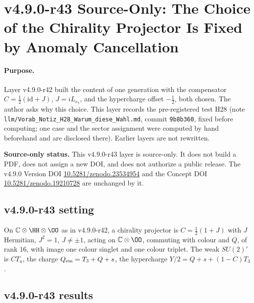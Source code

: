 \clearpage
\section*{v4.9.0-r43 Source-Only: The Choice of the Chirality Projector Is Fixed by Anomaly Cancellation}
\label{sec:v490-r43-choice-anomalies}

\paragraph{Purpose.}
Layer v4.9.0-r42 built the content of one generation with the compensator \(C=\tfrac12(\mathrm{id}+J)\), \(J=iL_{e_7}\), and the hypercharge
offset \(-\tfrac12\), both chosen.  The author asks why this choice.  This layer records the pre-registered test H28 (note
\texttt{llm/Vorab\_Notiz\_H28\_Warum\_diese\_Wahl.md}, commit \texttt{9b8b360}, fixed before computing; one case and the sector
assignment were computed by hand beforehand and are disclosed there).  Earlier layers are not rewritten.

\noindent\textbf{Source-only status.}
This v4.9.0-r43 layer is source-only.  It does not build a PDF, does not assign a new DOI,
and does not authorize a public release.  The v4.9.0 Version DOI
\href{https://doi.org/10.5281/zenodo.23534954}{10.5281/zenodo.23534954} and the Concept DOI
\href{https://doi.org/10.5281/zenodo.19210728}{10.5281/zenodo.19210728} are unchanged by it.

\subsection*{v4.9.0-r43 setting}
\label{subsec:v490-r43-setting}

On \(\mathbb C\otimes\HH\otimes\OO\) as in v4.9.0-r42, a chirality projector is \(C=\tfrac12(1+J)\) with \(J\) Hermitian, \(J^2=1\), \(J\neq\pm1\),
acting on \(\mathbb C\otimes\OO\), commuting with colour and \(Q\), of rank \(16\), with image one colour singlet and one colour triplet.  The weak
\(SU(2)'\) is \(CT_a\), the charge \(Q_{\rm em}=T_3+Q+s\), the hypercharge \(Y/2=Q+s+(1-C)T_3\).

\subsection*{v4.9.0-r43 results}
\label{subsec:v490-r43-results}

